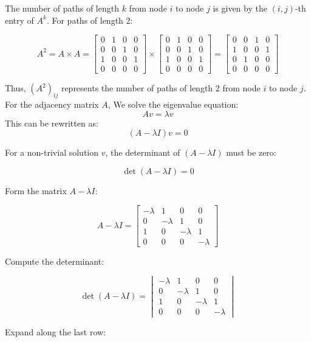 \documentclass[12pt]{article}
\begin{document}
The number of paths of length \( k \) from node \( i \) to node \( j \) is given by the \( (i,j) \)-th entry of \( A^k \). For paths of length 2:

\[
A^2 = A \times A = \begin{bmatrix}
0 & 1 & 0 & 0 \\
0 & 0 & 1 & 0 \\
1 & 0 & 0 & 1 \\
0 & 0 & 0 & 0
\end{bmatrix}
\times
\begin{bmatrix}
0 & 1 & 0 & 0 \\
0 & 0 & 1 & 0 \\
1 & 0 & 0 & 1 \\
0 & 0 & 0 & 0
\end{bmatrix}
=
\begin{bmatrix}
0 & 0 & 1 & 0 \\
1 & 0 & 0 & 1 \\
0 & 1 & 0 & 0 \\
0 & 0 & 0 & 0
\end{bmatrix}
\]

Thus, \( (A^2)_{ij} \) represents the number of paths of length 2 from node \( i \) to node \( j \).
For the adjacency matrix \( A \), We solve the eigenvalue equation:
\[
A v = \lambda v
\]
This can be rewritten as:
\[
(A - \lambda I) v = 0
\]

For a non-trivial solution \( v \), the determinant of \( (A - \lambda I) \) must be zero:

\[
\det(A - \lambda I) = 0
\]

Form the matrix \( A - \lambda I \):

\[
A - \lambda I = \begin{bmatrix}
-\lambda & 1 & 0 & 0 \\
0 & -\lambda & 1 & 0 \\
1 & 0 & -\lambda & 1 \\
0 & 0 & 0 & -\lambda
\end{bmatrix}
\]

Compute the determinant:

\[
\det(A - \lambda I) = \begin{vmatrix}
-\lambda & 1 & 0 & 0 \\
0 & -\lambda & 1 & 0 \\
1 & 0 & -\lambda & 1 \\
0 & 0 & 0 & -\lambda
\end{vmatrix}
\]

Expand along the last row:
\end{document}
